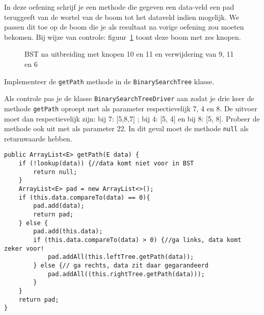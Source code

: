 \begin{oef}
\code In deze oefening schrijf je een methode die gegeven een data-veld een pad teruggeeft van de wortel van de boom tot het dataveld indien mogelijk. We passen dit toe op de boom die je als resultaat na vorige oefening zou moeten bekomen. Bij wijze van controle: figuur~\ref{fig:oefgetpathboom} toont deze boom met zes knopen.
\begin{figure}[htbp]
    \centering
{}
\cprotect\caption{BST na uitbreiding met knopen 10 en 11 en verwijdering van 9, 11 en 6}
    \label{fig:oefgetpathboom}
\end{figure}
\begin{oefenumerate}
	\item Implementeer de \verb=getPath= methode in de \verb=BinarySearchTree= klasse. 
	\item Als controle pas je de klasse  \verb=BinarySearchTreeDriver= aan zodat je drie keer de methode \verb+getPath+ oproept met als parameter respectievelijk 7, 4 en 8. De uitvoer moet dan respectievelijk zijn: bij 7: [5,8,7] ; bij 4: [5, 4] en bij 8: [5, 8]. Probeer de methode ook uit met als parameter 22. In dit geval moet de methode \verb+null+ als returnwaarde hebben.
	
\end{oefenumerate}
\begin{opl}
\begin{lstlisting}[caption={getPath methode}, label=bstgetpath]
public ArrayList<E> getPath(E data) {
	if (!lookup(data)) {//data komt niet voor in BST
		return null;
	}
	ArrayList<E> pad = new ArrayList<>();
	if (this.data.compareTo(data) == 0){
		pad.add(data);
		return pad;
	} else {
		pad.add(this.data);
		if (this.data.compareTo(data) > 0) {//ga links, data komt zeker voor!
			pad.addAll(this.leftTree.getPath(data));
		} else {// ga rechts, data zit daar gegarandeerd
			pad.addAll((this.rightTree.getPath(data)));
		}
	}
	return pad;
}
\end{lstlisting}

\end{opl}
\end{oef}

